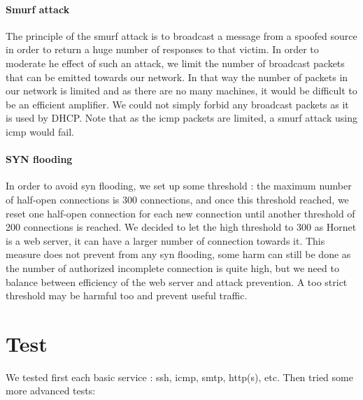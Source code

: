 \documentclass[a4paper,titlepage]{article}
\begin{document}
\paragraph{Smurf attack}
The principle of the smurf attack is to broadcast a message from a spoofed source in order to return a huge number of responses to that victim.
In order to moderate he effect of such an attack, we limit the number of broadcast packets that can be emitted towards our network. In that way the number of packets in our network is limited and as there are no many machines, it would be difficult to be an efficient amplifier.
We could not simply forbid any broadcast packets as it is used by DHCP. Note that as the icmp packets are limited, a smurf attack using icmp would fail.

\paragraph{SYN flooding}
In order to avoid syn flooding, we set up some threshold : the maximum number of half-open connections is 300 connections, and once this threshold reached, we reset one half-open connection for each new connection until another threshold of 200 connections is reached. We decided to let the high threshold to 300 as Hornet is a web server, it can have a larger number of connection towards it. This measure does not prevent from any syn flooding, some harm can still be done as the number of authorized incomplete connection is quite high, but we need to balance between efficiency of the web server and attack prevention. A too strict threshold may be harmful too and prevent useful traffic.

\section{Test}
We tested first each basic service : ssh, icmp, smtp, http(s), etc. Then tried some more advanced tests:
\end{document}
